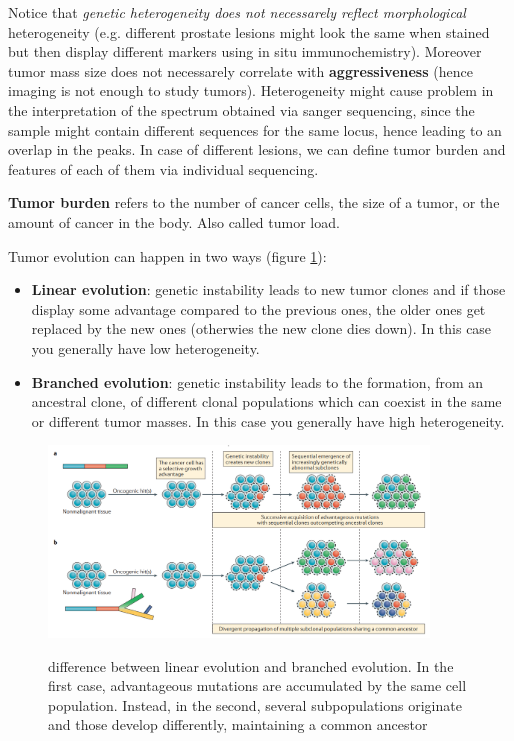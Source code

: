   Notice that\textit{ genetic heterogeneity does not necessarely reflect
  morphological} heterogeneity (e.g. different prostate lesions might look the
  same when stained but then display different markers using in situ
  immunochemistry). Moreover tumor mass size does not necessarely correlate with
  \textbf{aggressiveness} (hence imaging is not enough to study tumors).
  Heterogeneity might cause problem in the interpretation of the spectrum
  obtained via sanger sequencing, since the sample might contain different
  sequences for the same locus, hence leading to an overlap in the peaks. In
  case of different lesions, we can define tumor burden and features of each of
  them via individual sequencing.

  \begin{definition}
    \textbf{Tumor burden} refers to the number of cancer cells, the size of a
    tumor, or the amount of cancer in the body. Also called tumor load.    
  \end{definition}
  
  Tumor evolution can happen in two ways (figure \ref{fig: tumor evolution}):
  \begin{itemize}
    \item \textbf{Linear evolution}: genetic instability leads to new tumor
    clones and if those display some advantage compared to the previous ones,
    the older ones get replaced by the new ones (otherwies the new clone dies
    down). In this case you generally have low heterogeneity. 
    \item \textbf{Branched evolution}: genetic instability leads to the
    formation, from an ancestral clone, of different clonal populations which
    can coexist in the same or different tumor masses. In this case you
    generally have high heterogeneity.
  \end{itemize}

  \begin{figure}[ht]
    \caption{difference between linear evolution and branched evolution. In the
    first case, advantageous mutations are accumulated by the same cell
    population. Instead, in the second, several subpopulations originate and
    those develop differently, maintaining a common ancestor}
    \centering
    \includegraphics[width=0.9\textwidth]{image_09.PNG}
    \label{fig: tumor evolution}
  \end{figure}
  
